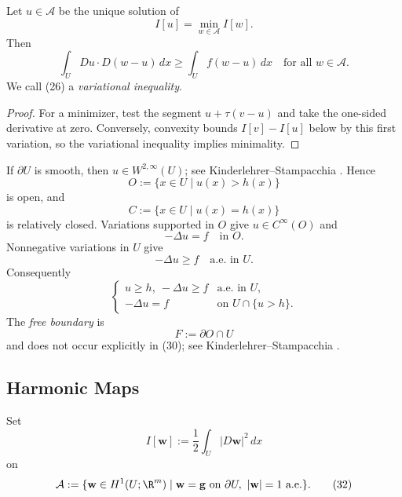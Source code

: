 \begin{theorem}
\label{thm:variational-inequality-characterization}
Let $u \in \mathcal{A}$ be the unique solution of
\[
I[u] = \min_{w \in \mathcal{A}} I[w].
\]
Then
\[
\int_U Du \cdot D(w - u)\, dx \geq \int_U f(w - u)\, dx \quad \text{for all } w \in \mathcal{A}.
\tag{26}
\]
We call (26) a \textit{variational inequality}.
\end{theorem}

\begin{proof}
\sketch For a minimizer, test the segment $u+\tau(v-u)$ and take the one-sided derivative at zero. Conversely, convexity bounds $I[v]-I[u]$ below by this first variation, so the variational inequality implies minimality.
\end{proof}

\begin{remark}
\label{rem:obstacle-problem-free-boundary-interpretation}
If $\partial U$ is smooth, then $u\in W^{2,\infty}(U)$; see Kinderlehrer--Stampacchia \cite{KinderlehrerStampacchia1980}. Hence
\[
O := \{x \in U \mid u(x) > h(x)\}
\]
is open, and
\[
C := \{x \in U \mid u(x) = h(x)\}
\]
is relatively closed. Variations supported in $O$ give $u\in C^\infty(O)$ and
\[
-\Delta u = f \quad \text{in } O.
\tag{28}
\]
Nonnegative variations in $U$ give
\[
-\Delta u \geq f \quad \text{a.e. in } U.
\tag{29}
\]
Consequently
\[
\begin{cases}
u \geq h,\ -\Delta u \geq f & \text{a.e. in } U,\\
-\Delta u = f & \text{on } U \cap \{u > h\}.
\end{cases}
\tag{30}
\]
The \textit{free boundary} is
\[
F := \partial O \cap U
\]
and does not occur explicitly in (30); see Kinderlehrer--Stampacchia \cite{KinderlehrerStampacchia1980}.
\end{remark}

\subsection{Harmonic Maps}
\label{sec:harmonic-maps-pointwise-constraints}

Set
\[
I[\mathbf w]:=\frac12\int_U|D\mathbf w|^2\,dx
\tag{31}
\]
on
\[
\mathcal A:=\{\mathbf w\in H^1(U;\R^m)\mid
\mathbf w=\mathbf g\text{ on }\partial U,\ |\mathbf w|=1\text{ a.e.}\}.
\tag{32}
\]

